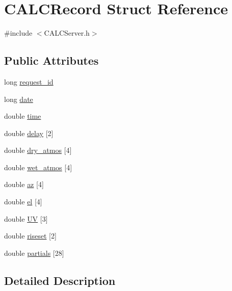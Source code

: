 \hypertarget{struct_c_a_l_c_record}{}\section{C\+A\+L\+C\+Record Struct Reference}
\label{struct_c_a_l_c_record}


{\ttfamily \#include $<$C\+A\+L\+C\+Server.\+h$>$}

\subsection*{Public Attributes}
\begin{DoxyCompactItemize}
\item 
long \hyperlink{struct_c_a_l_c_record_aef69993a7851234d7e13e45a5b2d2304}{request\+\_\+id}
\item 
long \hyperlink{struct_c_a_l_c_record_a8fbea96c2dfd0a58a1a9629ee487e872}{date}
\item 
double \hyperlink{struct_c_a_l_c_record_a0248175f80e111ae370307f9c2b87b05}{time}
\item 
double \hyperlink{struct_c_a_l_c_record_ab81894c6c1f2737cb7c547e29e59ed6c}{delay} \mbox{[}2\mbox{]}
\item 
double \hyperlink{struct_c_a_l_c_record_a44d9229ead54529799ab2bc1c62071d6}{dry\+\_\+atmos} \mbox{[}4\mbox{]}
\item 
double \hyperlink{struct_c_a_l_c_record_aed3cc6fcc95a72cf0222398f5a7745c6}{wet\+\_\+atmos} \mbox{[}4\mbox{]}
\item 
double \hyperlink{struct_c_a_l_c_record_ae6bcf36dea38862c1b887de836d8c97d}{az} \mbox{[}4\mbox{]}
\item 
double \hyperlink{struct_c_a_l_c_record_aa639dc99781303cbcecb1591d1c2eb2b}{el} \mbox{[}4\mbox{]}
\item 
double \hyperlink{struct_c_a_l_c_record_ab0b23df760eaf81ad5449e70ac646d9b}{UV} \mbox{[}3\mbox{]}
\item 
double \hyperlink{struct_c_a_l_c_record_a8d637728f0f4139ebbab32666c7ecee0}{riseset} \mbox{[}2\mbox{]}
\item 
double \hyperlink{struct_c_a_l_c_record_a11aec7337258d57178ff5bd055221135}{partials} \mbox{[}28\mbox{]}
\end{DoxyCompactItemize}


\subsection{Detailed Description}


